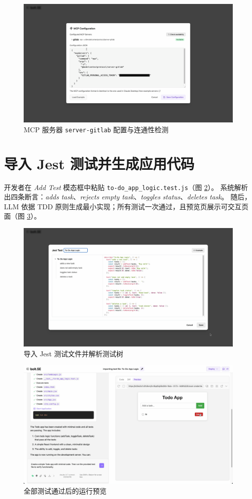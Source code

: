 \begin{figure}[htbp]
  \centering
  \includegraphics[width=.8\textwidth]{figures/screenshots/ci-cd/mcp_gitlab_cfg.png}
  \caption{MCP 服务器 \texttt{server-gitlab} 配置与连通性检测}
  \label{fig:mcp_gitlab_cfg}
\end{figure}

\section{导入 Jest 测试并生成应用代码}

开发者在 \emph{Add Test} 模态框中粘贴 \texttt{to-do\_app\_logic.test.js}（图 \ref{fig:jest_import}）。  
系统解析出四条断言：\textit{adds task}、\textit{rejects empty task}、\textit{toggles status}、\textit{deletes task}。  
随后，LLM 依据 TDD 原则生成最小实现；所有测试一次通过，且预览页展示可交互页面（图 \ref{fig:app_preview}）。

\begin{figure}[htbp]
  \centering
  \includegraphics[width=.8\textwidth]{figures/screenshots/ci-cd/jest_import.png}
  \caption{导入 Jest 测试文件并解析测试树}
  \label{fig:jest_import}
\end{figure}

\begin{figure}[htbp]
  \centering
  \includegraphics[width=.8\textwidth]{figures/screenshots/ci-cd/app_preview.png}
  \caption{全部测试通过后的运行预览}
  \label{fig:app_preview}
\end{figure}

